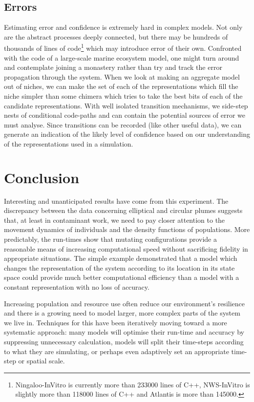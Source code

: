 \subsection{Errors}

Estimating error and confidence is extremely hard in complex models. Not only
are the abstract processes deeply connected, but there may be hundreds of
thousands of lines of code{\footnote{Ningaloo-InVitro is currently more than
233000 lines of C++, NWS-InVitro is slightly more than 118000 lines of C++ and
Atlantis is more than 145000.}} which may introduce error of their own.
Confronted with the code of a large-scale marine ecosystem model, one might
turn around and contemplate joining a monastery rather than try and track the
error propagation through the system. When we look at making an aggregate
model out of niches, we can make the set of each of the representations which
fill the niche simpler than some chimera which tries to take the best bits of
each of the candidate representations. With well isolated transition
mechanisms, we side-step nests of conditional code-paths and can contain the
potential sources of error we must analyse. Since transitions can be recorded
(like other useful data), we can generate an indication of the likely level of
confidence based on our understanding of the representations used in a
simulation.

\section{Conclusion}

Interesting and unanticipated results have come from this experiment. The
discrepancy between the data concerning elliptical and circular plumes
suggests that, at least in contaminant work, we need to pay closer attention
to the movement dynamics of individuals and the density functions of
populations. More predictably, the run-times show that mutating configurations
provide a reasonable means of increasing computational speed without
sacrificing fidelity in appropriate situations. The simple example
demonstrated that a model which changes the representation of the system
according to its location in its state space could provide much better
computational efficiency than a model with a constant representation with no
loss of accuracy.

Increasing population and resource use often reduce our environment's
resilience and there is a growing need to model larger, more complex parts of
the system we live in. Techniques for this have been iteratively moving toward
a more systematic approach: many models will optimise their run-time and
accuracy by suppressing unnecessary calculation, models will split their
time-steps according to what they are simulating, or perhaps even adaptively
set an appropriate time-step or spatial scale.

